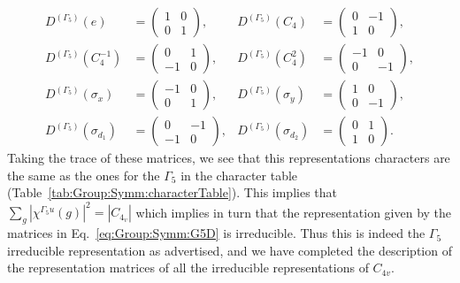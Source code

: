 \begin{subequations}
    \label{eq:Group:Symm:G5D}
\begin{align}
    D^{(\Gamma_5)}(e) &=
    \begin{pmatrix}
        1 & 0\\
        0 & 1
    \end{pmatrix}, & D^{(\Gamma_5)}(C_4) &=
    \begin{pmatrix}
        0 & -1\\
        1 & 0
    \end{pmatrix},\\
    D^{(\Gamma_5)}(C_4^{-1}) &=
    \begin{pmatrix}
        0 & 1\\
        -1 & 0
    \end{pmatrix}, & D^{(\Gamma_5)}(C_4^2) &= 
    \begin{pmatrix}
        -1 & 0\\
        0 & -1
    \end{pmatrix},\\
    D^{(\Gamma_5)}(\sigma_x) &= 
    \begin{pmatrix}
        -1 & 0\\
        0 & 1
    \end{pmatrix}, & D^{(\Gamma_5)}(\sigma_y) &=
    \begin{pmatrix}
        1 & 0\\
        0 & -1
    \end{pmatrix},\\
    D^{(\Gamma_5)}(\sigma_{d_1}) &=
    \begin{pmatrix}
        0 & -1\\
        -1 & 0
    \end{pmatrix}, & D^{(\Gamma_5)}(\sigma_{d_2}) &=
    \begin{pmatrix}
        0 & 1\\
        1 & 0
    \end{pmatrix}.
\end{align}
\end{subequations}
Taking the trace of these matrices, we see that this representations characters are the same as the ones for the \irr $\Gamma_5$ in the character table
(Table~\ref{tab:Group:Symm:characterTable}). This implies that $\sum_g|\chi^{\Gamma_5u}(g)|^2 = |C_{4_v}|$ which implies in turn that the representation
given by the matrices in Eq.~\eqref{eq:Group:Symm:G5D} is irreducible. Thus this is indeed the $\Gamma_5$ irreducible representation as advertised,
and we have completed the description of the representation matrices of all the irreducible representations of $C_{4v}$.

